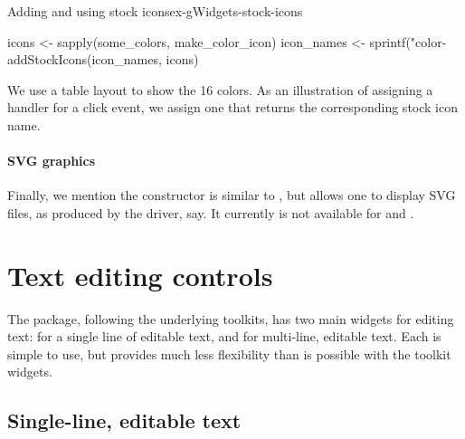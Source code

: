 \begin{example}{Adding and using stock icons}{ex-gWidgets-stock-icons}
\begin{Schunk}
\begin{Sinput}
 icons <- sapply(some_colors, make_color_icon)
 icon_names <- sprintf("color-%
 addStockIcons(icon_names, icons)
\end{Sinput}
\end{Schunk}

We use a table layout to show the 16 colors. As an illustration of
assigning a handler for a click event, we assign one that returns the
corresponding stock icon name.

\begin{Schunk}
\end{Schunk}
\end{example}

\paragraph{SVG graphics}
Finally, we mention the  constructor is similar to
, but allows one to display SVG files, as produced
by the  driver, say. It currently is not available for
 and .


\section{Text editing controls}
\label{sec:gWidgets-text-edit-contr}
The  package, following the underlying toolkits, has two
main widgets for editing text:  for a single line
of editable text, and  for multi-line, editable
text. Each is simple to use, but provides much less flexibility than
is possible with the toolkit widgets.



\subsection{Single-line, editable text}
\label{sec:gWidgets-single-line-editable}


